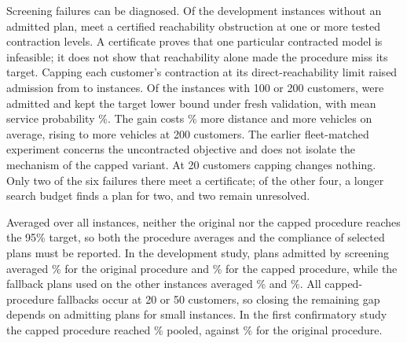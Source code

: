 \documentclass[11pt,a4paper]{article}
\begin{document}
Screening failures can be diagnosed. Of the \FailureCount{} development instances
without an admitted plan, \CertifiedFailures{} meet a certified reachability
obstruction at one or more tested contraction levels. A certificate proves that
one particular contracted model is infeasible; it does not show that reachability
alone made the procedure miss its target. Capping each customer's contraction at
its direct-reachability limit raised admission from \OriginalSelected{} to
\CappedSelected{} instances. Of the instances with 100 or 200 customers,
\CappedLargeSelected{} were admitted and \CappedLargeRetained{} kept the target
lower bound under fresh validation, with mean service probability
\CappedLargeRange\%. The gain costs \CappedDistanceCost\% more distance and
\CappedFleetCost{} more vehicles on average, rising to \CappedFleetLarge{} more
vehicles at 200 customers. The earlier fleet-matched experiment concerns the
uncontracted objective and does not isolate the mechanism of the capped variant.
At 20 customers capping changes nothing. Only two of the six failures there meet
a certificate; of the other four, a longer search budget finds a plan for two,
and two remain unresolved.

Averaged over all instances, neither the original nor the capped procedure reaches
the 95\% target,
so both the procedure averages and the compliance of selected plans must be
reported. In the
development study, plans admitted by screening averaged \OriginalSelectedMean\%
for the original procedure and \CappedSelectedMean\% for the capped procedure,
while the fallback plans used on the other instances averaged
\OriginalFallbackMean\% and \CappedFallbackMean\%. All \CappedFallbackCount{}
capped-procedure fallbacks occur at 20 or 50 customers, so closing the remaining
gap depends on admitting plans for small instances. In the first confirmatory
study the capped procedure reached \ConfPooledK\% pooled, against \ConfPooledP\%
for the original procedure.
\end{document}
